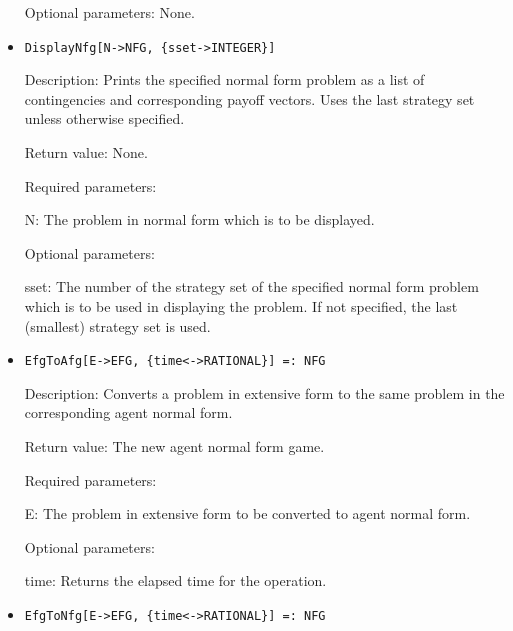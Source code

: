 \begin{itemize}
\item
[Optional parameters:] None.
\ed

\item
\protect \large \begin{verbatim}
DisplayNfg[N->NFG, {sset->INTEGER}]
\end{verbatim}\normalsize

\bd
\item
[Description:] Prints the specified normal form problem as a list of
contingencies and corresponding payoff vectors.  Uses the last
strategy set unless otherwise specified.
\item
[Return value:] None.
\item
[Required parameters:]\hfil\null

\bd	
\item
[N:] The problem in normal form which is to be displayed.
\ed

\item
[Optional parameters:]\hfil\null

\bd
\item
[sset:] The number of the strategy set of the specified normal form
problem which is to be used in displaying the problem.  If not
specified, the last (smallest) strategy set is used.
\ed
\ed

\item
\protect \large \begin{verbatim}
EfgToAfg[E->EFG, {time<->RATIONAL}] =: NFG
\end{verbatim}\normalsize

\bd
\item
[Description:] Converts a problem in extensive form to the same
problem in the corresponding agent normal form.
\item
[Return value:] The new agent normal form game.
\item 
[Required parameters:]\hfil\null

\bd
\item
[E:] The problem in extensive form to be converted to agent normal
form.
\ed

\item
[Optional parameters:]\hfil\null
	
\bd
\item
[time:] Returns the elapsed time for the operation.
\ed
\ed

\item
\protect \large \begin{verbatim}
EfgToNfg[E->EFG, {time<->RATIONAL}] =: NFG
\end{verbatim}\normalsize


\end{itemize}
